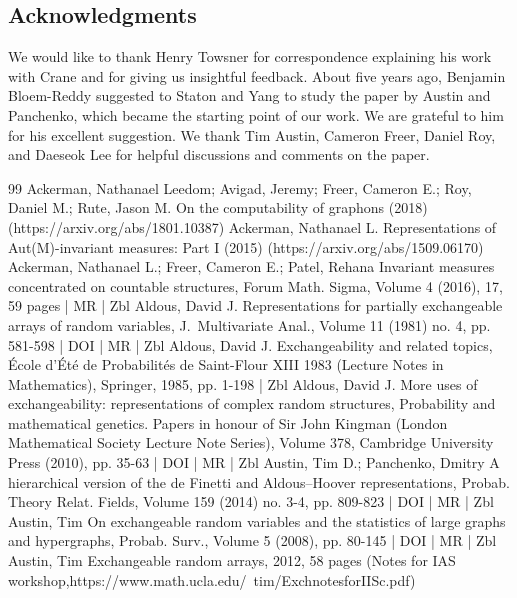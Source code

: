 \documentclass[10pt]{amsart}
\theoremstyle{definition}\newtheorem{defi}[theo]{Definition}\newtheorem{rema}[theo]{Remark}\newtheorem{exam}[theo]{Example}\newtheorem{exem}[theo]{Example}\newtheorem{nota}[theo]{Notation}
\begin{document}
\subsection*{Acknowledgments}

We would like to thank Henry Towsner for correspondence explaining his work with Crane and for giving us insightful feedback. About five years ago, Benjamin Bloem-Reddy suggested to Staton and Yang to study the paper by Austin and Panchenko, which became the starting point of our work. We are grateful to him for his excellent suggestion. We thank Tim Austin, Cameron Freer, Daniel Roy, and Daeseok Lee for helpful discussions and comments on the paper. 



\begin{thebibliography}{99}
Ackerman, Nathanael Leedom; Avigad, Jeremy; Freer, Cameron E.; Roy, Daniel M.; Rute, Jason M. On the computability of graphons (2018) (https://arxiv.org/abs/1801.10387)
Ackerman, Nathanael L. Representations of Aut(M)-invariant measures: Part I (2015) (https://arxiv.org/abs/1509.06170)
Ackerman, Nathanael L.; Freer, Cameron E.; Patel, Rehana Invariant measures concentrated on countable structures, Forum Math. Sigma, Volume 4 (2016), 17, 59 pages | MR | Zbl
Aldous, David J. Representations for partially exchangeable arrays of random variables, J. Multivariate Anal., Volume 11 (1981) no. 4, pp. 581-598 | DOI | MR | Zbl
Aldous, David J. Exchangeability and related topics, École d’Été de Probabilités de Saint-Flour XIII 1983 (Lecture Notes in Mathematics), Springer, 1985, pp. 1-198 | Zbl
Aldous, David J. More uses of exchangeability: representations of complex random structures, Probability and mathematical genetics. Papers in honour of Sir John Kingman (London Mathematical Society Lecture Note Series), Volume 378, Cambridge University Press (2010), pp. 35-63 | DOI | MR | Zbl
Austin, Tim D.; Panchenko, Dmitry A hierarchical version of the de Finetti and Aldous–Hoover representations, Probab. Theory Relat. Fields, Volume 159 (2014) no. 3-4, pp. 809-823 | DOI | MR | Zbl
Austin, Tim On exchangeable random variables and the statistics of large graphs and hypergraphs, Probab. Surv., Volume 5 (2008), pp. 80-145 | DOI | MR | Zbl
Austin, Tim Exchangeable random arrays, 2012, 58 pages (Notes for IAS workshop,https://www.math.ucla.edu/~tim/ExchnotesforIISc.pdf)

\end{thebibliography}
\end{document}
